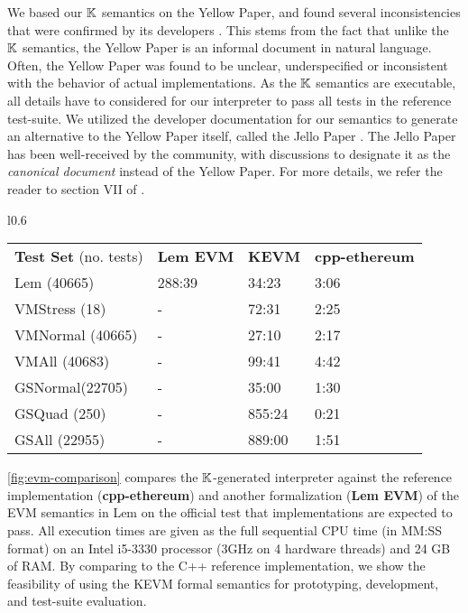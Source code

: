 We based our $\mathbb{K}$ semantics on the Yellow Paper, and
found several inconsistencies that were confirmed by its developers \cite{HildenbrandtCSF18}.
This stems from the fact that unlike the $\mathbb{K}$ semantics,
the Yellow Paper is an informal document in natural language.
Often, the Yellow Paper was found to be unclear, underspecified
or inconsistent with the behavior of actual implementations.
As the $\mathbb{K}$ semantics are executable, all details have to
considered for our interpreter to pass all tests in the reference
test-suite. We utilized the developer documentation for our semantics
to generate an alternative to the Yellow Paper itself, called the Jello Paper
\cite{evmJellopaperUrl}. The Jello Paper has been well-received by the
community, with discussions to designate it as the \emph{canonical document}
instead of the Yellow Paper. For more details, we refer the reader to
section VII of \cite{HildenbrandtCSF18}.

\begin{wrapfigure}{l}{0.6\textwidth}
      \begin{tabular}{ l l l l }
          \textbf{Test Set} (no. tests) & \textbf{Lem EVM} & \textbf{KEVM} & \textbf{cpp-ethereum} \\
          Lem (40665)                   & 288:39           & 34:23         & 3:06                  \\
          VMStress (18)                 & -                & 72:31         & 2:25                  \\
          VMNormal (40665)              & -                & 27:10         & 2:17                  \\
          VMAll (40683)                 & -                & 99:41         & 4:42                  \\
          GSNormal(22705)               & -                & 35:00         & 1:30                  \\
          GSQuad (250)                  & -                & 855:24        & 0:21                  \\
          GSAll (22955)                 & -                & 889:00        & 1:51                  \\
      \end{tabular}
  \caption{Lem EVM vs KEVM vs cpp-ethereum}\label{fig:evm-comparison}
\end{wrapfigure}
\figurename{} \ref{fig:evm-comparison} compares the $\mathbb{K}{}$-generated interpreter
against the reference implementation (\textbf{cpp-ethereum}) and
another formalization (\textbf{Lem EVM}) of the EVM semantics \cite{HiraiWSTC17} in Lem \cite{MulliganACM14}
on the official test that implementations are expected to pass.
All execution times are given as the full sequential CPU time (in MM:SS format) on an Intel i5-3330 processor (3GHz on 4 hardware threads) and 24 GB of RAM.
By comparing to the C++ reference implementation, we show the feasibility of using the KEVM formal semantics for prototyping, development, and test-suite evaluation.

